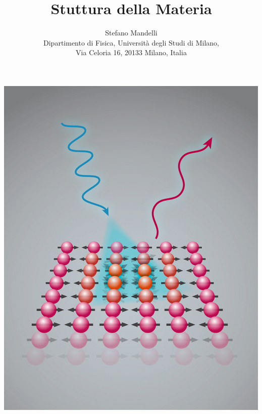 \documentclass[a4paper,12pt]{article}
\begin{document}
\title{\bf \Huge Stuttura della Materia}

\author{Stefano Mandelli\\
	Dipartimento di Fisica, Universit\`a degli Studi di Milano,\\
	Via Celoria 16, 20133 Milano, Italia
}

\maketitle
\begin{center}
\includegraphics[scale=0.9]{IMG/copertina.jpg}
\end{center}

\newpage
\tableofcontents
\newpage
\end{document}
